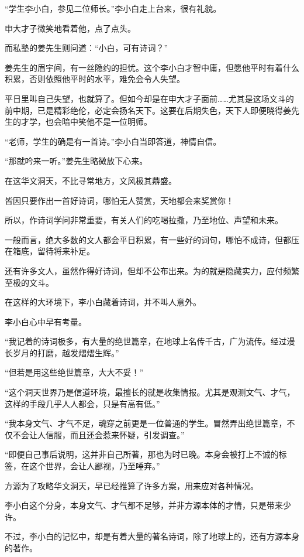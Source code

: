 
\begin{this_body}

“学生李小白，参见二位师长。”李小白走上台来，很有礼貌。

申大才子微笑地看着他，点了点头。

而私塾的姜先生则问道：“小白，可有诗词？”

姜先生的眉宇间，有一丝隐约的担忧。这个李小白才智中庸，但愿他平时有着什么积累，否则依照他平时的水平，难免会令人失望。

平日里叫自己失望，也就算了。但如今却是在申大才子面前……尤其是这场文斗的前中期，已是精彩绝伦，必定会扬名天下。这要在后期失色，天下人即便晓得姜先生的才学，也会暗中笑他不是一位明师。

“老师，学生的确是有一首诗。”李小白当即答道，神情自信。

“那就吟来一听。”姜先生略微放下心来。

在这华文洞天，不比寻常地方，文风极其鼎盛。

皆因只要作出一首好诗词，哪怕无人赞赏，天地都会来奖赏你！

所以，作诗词学问非常重要，有关人们的吃喝拉撒，乃至地位、声望和未来。

一般而言，绝大多数的文人都会平日积累，有一些好的词句，哪怕不成诗，但都压在箱底，留待将来补足。

还有许多文人，虽然作得好诗词，但却不公布出来。为的就是隐藏实力，应付频繁至极的文斗。

在这样的大环境下，李小白藏着诗词，并不叫人意外。

李小白心中早有考量。

“我记着的诗词极多，有大量的绝世篇章，在地球上名传千古，广为流传。经过漫长岁月的打磨，越发熠熠生辉。”

“但若是用这些绝世篇章，大大不妥！”

“这个洞天世界乃是信道环境，最擅长的就是收集情报。尤其是观测文气、才气，这样的手段几乎人人都会，只是有高有低。”

“我本身文气、才气不足，魂穿之前更是一位普通的学生。冒然弄出绝世篇章，不仅不会让人信服，而且还会惹来怀疑，引发调查。”

“即便自己事后说明，这并非自己所著，那也为时已晚。本身会被打上不诚的标签，在这个世界，会让人鄙视，乃至唾弃。”

方源为了攻略华文洞天，早已经推算了许多方案，用来应对各种情况。

李小白这个分身，本身文气、才气都不足够，并非方源本体的才情，只是带来少许。

不过，李小白的记忆中，却是有着大量的著名诗词，除了地球上的，还有方源本身的著作。


\end{this_body}

